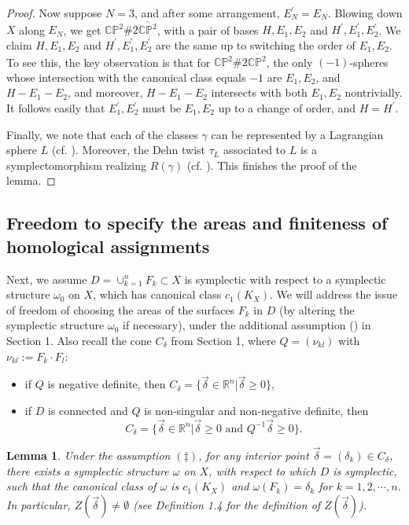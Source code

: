 \documentclass[11pt]{amsart}
\theoremstyle{plain}
\numberwithin{theorem}{section}
\newtheorem{lemma}[theorem]{Lemma}
\theoremstyle{definition}
\newcommand{\C}{{\mathbb C}}
\newcommand{\R}{{\mathbb R}}
\renewcommand{\P}{{\mathbb P}}
\begin{document}
\begin{proof}
Now suppose $N=3$, and after some arrangement, $E_N^\prime=E_N$. Blowing down $X$ along $E_N$, we get $\C\P^2\# 2\overline{\C\P^2}$, with a pair of bases $H,E_1,E_2$ and $H^\prime,E_1^\prime,E_2^\prime$. We claim $H,E_1,E_2$ and $H^\prime,E_1^\prime,E_2^\prime$ are the same up to switching the order of $E_1,E_2$.
To see this, the key observation is that for $\C\P^2\# 2\overline{\C\P^2}$, the only $(-1)$-spheres 
whose intersection with the canonical class equals $-1$ are $E_1,E_2$, and $H-E_1-E_2$, and
moreover, $H-E_1-E_2$ intersects with both $E_1,E_2$ nontrivially. It follows easily that
$E_1^\prime,E_2^\prime$ must be $E_1,E_2$ up to a change of order, and $H=H^\prime$. 

Finally, we note that each of the classes $\gamma$ can be represented by a Lagrangian
sphere $L$ (cf. \cite{LW}). Moreover, the Dehn twist $\tau_L$ associated to $L$ is a symplectomorphism realizing $R(\gamma)$ (cf. \cite{Seidel}). This finishes the proof of the lemma.

\end{proof}

\subsection{Freedom to specify the areas and finiteness of homological assignments}

Next, we assume $D=\cup_{k=1}^n F_k\subset X$ is symplectic with respect to a symplectic structure $\omega_0$ on $X$, which has canonical class $c_1(K_X)$. We will address the issue of freedom of choosing the areas of the surfaces $F_k$ in $D$ (by altering the symplectic structure $\omega_0$ if necessary), under the additional assumption (\ddag) in Section 1. Also recall the cone $C_\delta$ from Section 1, where $Q=(\nu_{kl})$ with 
$\nu_{kl}:=F_k\cdot F_l$:
\begin{itemize}
\item if $Q$ is negative definite, then $C_\delta=\{\vec{\delta}\in\R^n|\vec{\delta}\geq 0\}$, 
\item if $D$ is connected and $Q$ is non-singular and non-negative definite, then
$$
C_\delta=\{\vec{\delta}\in\R^n|\vec{\delta}\geq 0 \mbox{ and } Q^{-1}\vec{\delta}\geq 0\}.
$$
\end{itemize}

\begin{lemma}
Under the assumption $(\ddag)$,  for any interior point $\vec{\delta}=(\delta_k)\in C_\delta$, there exists a symplectic structure $\omega$ on $X$, with respect to which $D$ is symplectic, such that the canonical class of
$\omega$ is $c_1(K_X)$ and $\omega(F_k)=\delta_k$ for $k=1,2,\cdots,n$. In particular, $Z(\vec{\delta})\neq \emptyset$ (see Definition 1.4 for the definition of $Z(\vec{\delta})$).
\end{lemma}
\end{document}
